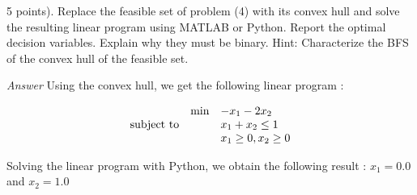 \documentclass[10pt]{article}
\newenvironment{exercise}[2][Exercise]{\begin{trivlist}
  \item[\hskip \labelsep {\bfseries #1}\hskip \labelsep {\bfseries #2.}]}{\end{trivlist}}
\begin{document}
\begin{exercise}{4}
(5 points). Replace the feasible set of problem (4) with its convex hull and solve the resulting linear program using MATLAB or Python. Report the optimal decision variables. Explain why they must be binary. Hint:
Characterize the BFS of the convex hull of the feasible set.


\textit{Answer}
Using the convex hull, we get the following linear program : 


\begin{equation*}
\begin{array}{lll@{}lll}
&\text{min}  & - x_1 - 2 x_2  &\\
\text{subject to} 
&& x_1 + x_2 \leq 1 \\
&&  x_1  \geq 0,  x_2 \geq 0 \\
          
\end{array}
\end{equation*}

Solving the linear program with Python, we obtain  the following result : $x_1 =  0.0$ and $x_2 = 1.0$


\end{exercise}
  
  
\end{document}
